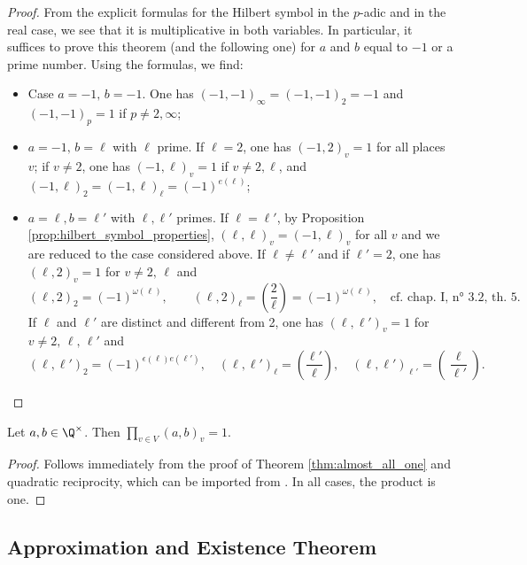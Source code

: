 \begin{proof}
	From the explicit formulas for the Hilbert symbol in the $p$-adic and in the real case, we see
	that it is multiplicative in both variables. 	In particular, it suffices to prove this theorem
	(and the following one) for $a$ and $b$ equal to $-1$ or
	a prime number. Using the formulas, we find:
	\begin{itemize}
	\item Case $a = -1, \, b = -1$. One has $(-1, -1)_\infty = (-1, -1)_2 = -1$ and
	$(-1, -1)_p = 1$ if $p \ne 2, \infty$;
  \item $a = -1, \, b = \ell$ with $\ell$ prime. If $\ell=2$, one has $(-1, 2)_v = 1$
	for all places $v$; if $v \ne 2$, one has $(-1, \ell)_v = 1$ if $v \ne 2, \ell$,
	and $(-1, \ell)_2 = (-1, \ell)_{\ell} = (-1)^{e(\ell)}$;
  \item $a = \ell, b = \ell'$ with $\ell, \ell'$ primes. If $\ell = \ell'$, by Proposition
	\ref{prop:hilbert_symbol_properties}, $(\ell, \ell)_v = (-1, \ell)_v$ for all $v$ and we are
	reduced to the case considered above. If $\ell \ne \ell'$ and if $\ell' = 2$, one has
	$(\ell, 2)_v = 1$ for $v \ne 2, \, \ell$ and
\[
(\ell, 2)_2 = (-1)^{\omega(\ell)}, \qquad (\ell, 2)_{\ell} = \left(\frac{2}{\ell}\right) = (-1)^{\omega(\ell)}, \quad \text{cf. chap. I, n° 3.2, th. 5.}
\]
If \( \ell \) and \( \ell' \) are distinct and different from 2, one has \( (\ell, \ell')_v = 1 \) for \( v \neq 2, \, \ell, \, \ell' \) and
\[
(\ell, \ell')_2 = (-1)^{\epsilon(\ell)e(\ell')}, \quad (\ell, \ell')_{\ell} = \left(\frac{\ell'}{\ell}\right), \quad (\ell, \ell')_{\ell'} = \left(\frac{\ell}{\ell'}\right).
\]
\end{itemize}
\end{proof}

\begin{theorem}
	\label{thm:product_formula}
	\leanok
Let $a, b \in \Q^\times$. Then $\prod_{v \in V} (a, b)_v = 1$.
\end{theorem}
\begin{proof}
	Follows immediately from the proof of Theorem \ref{thm:almost_all_one} and quadratic reciprocity,
	which can be imported from .
	In all cases, the product is one.
\end{proof}

\subsection{Approximation and Existence Theorem}


